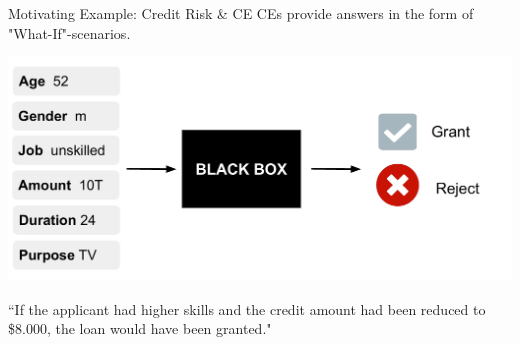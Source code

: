 \documentclass[10pt,compress,t,notes=noshow, xcolor=table]{beamer}
\begin{document}
\begin{frame}{Motivating Example: Credit Risk \& CE}
    CEs provide answers in the form of "What-If"-scenarios.
	
    \includegraphics[width=\linewidth, page=2]{figure/counterfactuals_credit.pdf}

    ``If the applicant had higher skills and the credit amount had been reduced to \$8.000, the loan would have been granted."  \\[0.2cm]

\end{frame}


\end{document}
